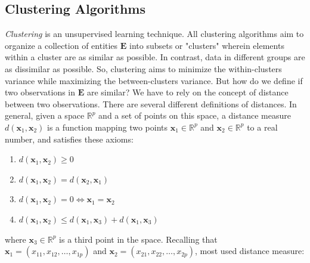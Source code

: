 
\subsection{Clustering Algorithms}
\label{sec:clustering}
\emph{Clustering} is an unsupervised learning technique. All clustering algorithms aim to organize a collection of entities $\mathbf{E}$ into subsets or "clusters" wherein elements within a cluster are as similar as possible. In contrast, data in different groups are as dissimilar as possible. So, clustering aims to minimize the within-clusters variance while maximizing the between-clusters variance. But how do we define if two observations in $\mathbf{E}$ are similar? We have to rely on the concept of distance between two observations. There are several different definitions of distances. In general, given a space $\mathbb{R}^p$ and a set of points on this space, a distance measure $d\left(\mathbf{x}_1,\mathbf{x}_2\right)$ is a function mapping two points $\mathbf{x}_1\in\mathbb{R}^p$ and $\mathbf{x}_2\in\mathbb{R}^p$ to a real number, and satisfies these axioms:
\begin{enumerate}
    \item $d\left(\mathbf{x}_1,\mathbf{x}_2\right) \geq 0$
    \item $d\left(\mathbf{x}_1,\mathbf{x}_2\right) = d\left(\mathbf{x}_2,\mathbf{x}_1\right)$
    \item $d\left(\mathbf{x}_1,\mathbf{x}_2\right)=0 \Leftrightarrow \mathbf{x}_1 = \mathbf{x}_2$
    \item $d\left(\mathbf{x}_1,\mathbf{x}_2\right) \leq d\left(\mathbf{x}_1,\mathbf{x}_3\right) + d\left(\mathbf{x}_1,\mathbf{x}_3\right)$
\end{enumerate}
where $\mathbf{x}_3 \in \mathbb{R}^p$ is a third point in the space. Recalling that $\mathbf{x}_1=\left(x_{11}, x_{12}, \dots, x_{1p} \right)$ and $\mathbf{x}_2=\left(x_{21}, x_{22}, \dots, x_{2p} \right)$, most used distance measure:
